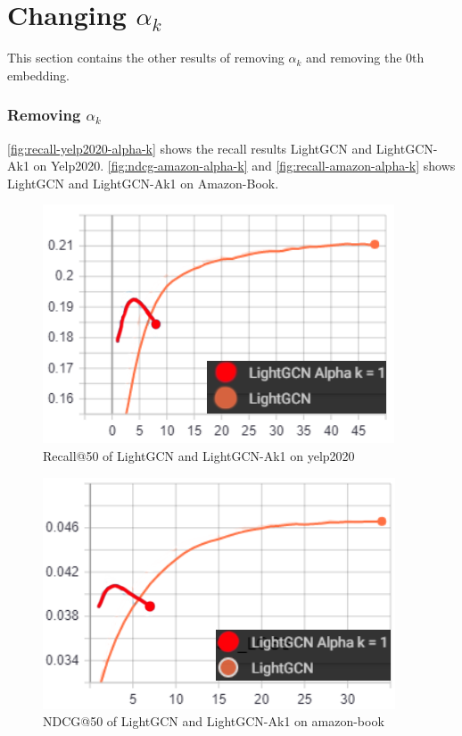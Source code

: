 \section{Changing $\alpha_k$}
This section contains the other results of removing $\alpha_k$ and removing the 0th embedding.

\subsubsection{Removing $\alpha_k$}\label{app:removing-alpha-k}
\autoref{fig:recall-yelp2020-alpha-k} shows the recall results LightGCN and LightGCN-Ak1 on Yelp2020.
\autoref{fig:ndcg-amazon-alpha-k} and \autoref{fig:recall-amazon-alpha-k} shows LightGCN and LightGCN-Ak1 on Amazon-Book.
\begin{figure}[h!]
    \includegraphics[width=\linewidth]{figures/alpha-k-results/yelp2020-recall.png}
    \caption{Recall@50 of LightGCN and LightGCN-Ak1 on yelp2020}
    \label{fig:recall-yelp2020-alpha-k}
\end{figure}
\begin{figure}[h!]
    \includegraphics[width=\linewidth]{figures/alpha-k-results/amazon-ndcg.png}
    \caption{NDCG@50 of LightGCN and LightGCN-Ak1 on amazon-book}
    \label{fig:ndcg-amazon-alpha-k}
\end{figure}
